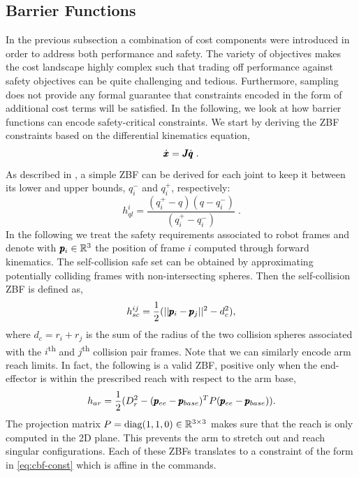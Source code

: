 
\subsection{Barrier Functions}
In the previous subsection a combination of cost components were introduced in order to address both performance and safety. The variety of objectives makes the cost landscape highly complex such that trading off performance against safety objectives can be quite challenging and tedious. Furthermore, sampling does not provide any formal guarantee that constraints encoded in the form of additional cost terms will be satisfied. In the following, we look at how barrier functions can encode safety-critical constraints. We start by deriving the ZBF constraints based on the differential kinematics equation,
\begin{equation}
    \dot{\pmb{x}} = \pmb{J} \dot{\pmb{q}}\;.
\end{equation}
As described in \cite{benzi2021optimization}, a simple ZBF can be derived for each joint to keep it between its lower and upper bounds, $q_i^-$ and $q_i^+$, respectively:
\begin{equation}
h_{ql}^i = \frac{(q_i^+ - q)(q - q_i^-)}{(q_i^+ - q_i^-)}\;.
\end{equation}
In the following we treat the safety requirements associated to robot frames and denote with $\pmb{p}_{i} \in \mathbb{R}^{3}$ the position of frame $i$ computed through forward kinematics.  
The self-collision safe set can be obtained by approximating potentially colliding frames with non-intersecting spheres. Then the self-collision ZBF is defined as,
\begin{equation}
    h_{sc}^{ij} = \frac{1}{2}(||\pmb{p}_i - \pmb{p}_j||^2 - d_c^2),
\end{equation}
where $d_c = r_i + r_j$ is the sum of the radius of the two collision spheres associated with the $i$\textsuperscript{th}  and $j$\textsuperscript{th} collision pair frames. Note that we can similarly encode arm reach limits. In fact, the following is a valid ZBF, positive only when the end-effector is within the prescribed reach with respect to the arm base,
\begin{equation}
    h_{ar} = \frac{1}{2}(D_r^2 - (\pmb{p}_{ee} - \pmb{p}_{base})^T P (\pmb{p}_{ee} - \pmb{p}_{base}) ).
\end{equation}
The projection matrix $P = \text{diag}(1, 1, 0) \in \mathbb{R}^{3 \times 3}$ makes sure that the reach is only computed in the 2D plane. This prevents the arm to stretch out and reach singular configurations. Each of these ZBFs translates to a constraint of the form in \eqref{eq:cbf-const} which is affine in the commands. 

